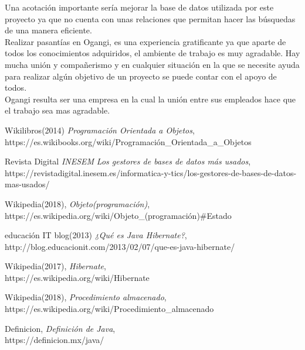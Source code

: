 \documentclass[12pt,oneside]{book}
\begin{document}
	Una acotación importante sería mejorar la base de datos utilizada por este proyecto ya que no cuenta con unas relaciones que permitan hacer las búsquedas de una manera eficiente.\\
	
	Realizar pasantías en Ogangi, es una experiencia gratificante ya que aparte de todos los conocimientos adquiridos, el ambiente de trabajo es muy agradable. Hay mucha unión y compañerismo y en cualquier situación en la que se necesite ayuda para realizar algún objetivo de un proyecto se puede contar con el apoyo de todos. \\
	
	Ogangi resulta ser una empresa en la cual la unión entre sus empleados hace que el trabajo sea mas agradable.
	

	
	


\begin{thebibliography}{9}
	Wikilibros(2014)
	\textit{ Programación Orientada a Objetos}, \\
	 https://es.wikibooks.org/wiki/Programación\_Orientada\_a\_Objetos
	
	Revista Digital \textit{INESEM}
	\textit{Los gestores de bases de datos más usados}, \\
	https://revistadigital.inesem.es/informatica-y-tics/los-gestores-de-bases-de-datos-mas-usados/
	
	Wikipedia(2018),
	\textit{Objeto(programación)}, \\
	https://es.wikipedia.org/wiki/Objeto\_(programación)\#Estado
	
	educación IT blog(2013)
	\textit{¿Qué es Java Hibernate?}, \\
	http://blog.educacionit.com/2013/02/07/que-es-java-hibernate/
	
	
	Wikipedia(2017),
	\textit{Hibernate}, \\
	https://es.wikipedia.org/wiki/Hibernate
	
	
	Wikipedia(2018),
	\textit{Procedimiento almacenado}, \\
	https://es.wikipedia.org/wiki/Procedimiento\_almacenado
	
	Definicion,
	\textit{Definición de Java}, \\
	https://definicion.mx/java/
\end{thebibliography} 
\end{document}
